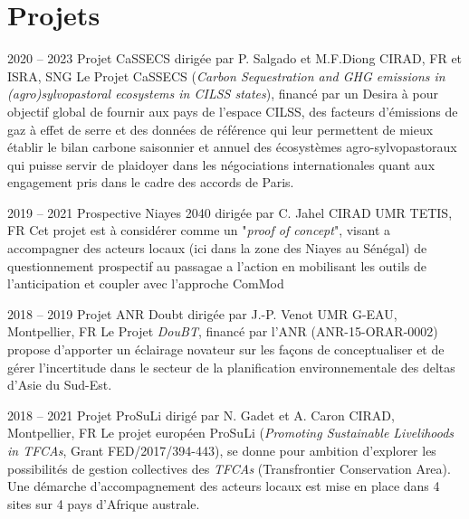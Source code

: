 \documentclass[]{cv-etienne}
\begin{document}
\section{Projets}
\begin{entrylist}
  \entry
  {2020 -- 2023}
  {Projet CaSSECS {\normalfont dirigée par P. Salgado et M.F.Diong}}
  {CIRAD, FR et ISRA, SNG}
  {
  Le Projet CaSSECS (\emph{Carbon Sequestration and GHG emissions in (agro)sylvopastoral ecosystems in CILSS states}), financé par un Desira à pour objectif global de fournir aux pays de l’espace CILSS, des facteurs d’émissions de gaz à effet de serre et des données de référence qui leur permettent de mieux établir le bilan carbone saisonnier et annuel des écosystèmes agro-sylvopastoraux qui puisse servir de plaidoyer dans les négociations internationales quant aux engagement pris dans le cadre des accords de Paris.
  }
\end{entrylist}
\begin{entrylist}
  \entry
  {2019 -- 2021}
  {Prospective Niayes 2040 {\normalfont dirigée par C. Jahel}}
  {CIRAD UMR TETIS, FR}
  {
  Cet projet est à considérer comme un "\textit{proof of concept}", visant a accompagner des acteurs locaux (ici dans la zone des Niayes au Sénégal) de questionnement prospectif au passagae a l'action en mobilisant les outils de l'anticipation et coupler avec l'approche ComMod
  }
\end{entrylist}
\begin{entrylist}
  \entry
  {2018 -- 2019}
  {Projet ANR Doubt {\normalfont dirigée par J.-P. Venot}}
  {UMR G-EAU, Montpellier, FR}
  {
  Le Projet \emph{DouBT}, financé par l'ANR (ANR-15-ORAR-0002) propose d'apporter un éclairage novateur sur les façons de conceptualiser et de gérer l'incertitude dans le secteur de la planification environnementale des deltas d'Asie du Sud-Est.
  }
\end{entrylist}
\begin{entrylist}
  \entry
  {2018 -- 2021}
  {Projet ProSuLi {\normalfont dirigé par N. Gadet et A. Caron}}
  {CIRAD, Montpellier, FR}
  {
  Le projet européen ProSuLi (\emph{Promoting Sustainable Livelihoods in TFCAs}, Grant FED/2017/394-443), se donne pour ambition d'explorer les possibilités de gestion collectives des \emph{TFCAs} (Transfrontier Conservation Area). Une démarche d'accompagnement des acteurs locaux est mise en place dans 4 sites sur 4 pays d'Afrique australe.
  }
\end{entrylist}
\end{document}
